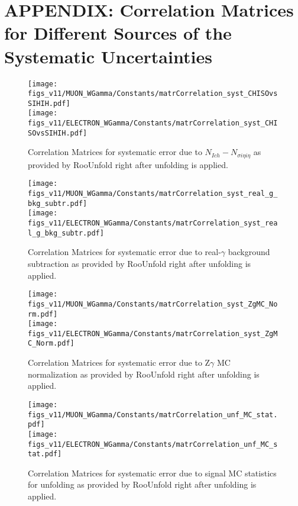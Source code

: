 \section{APPENDIX: Correlation Matrices for Different Sources of the Systematic Uncertainties}
\label{sec:corrMatrices}

\begin{figure}[htb]
  \begin{center}
   \texttt{[image: figs\_v11/MUON\_WGamma/Constants/matrCorrelation\_syst\_CHISOvsSIHIH.pdf]}\\
\texttt{[image: figs\_v11/ELECTRON\_WGamma/Constants/matrCorrelation\_syst\_CHISOvsSIHIH.pdf]}
  \caption{Correlation Matrices for systematic error due to $N_{Ich}-N_{\sigma i\eta i\eta}$ as provided by RooUnfold right after unfolding is applied.}
  \label{fig:corrMatrices_syst_CHISOvsSIHIH_Wg}
  \end{center}
\end{figure}

\begin{figure}[htb]
  \begin{center}
   \texttt{[image: figs\_v11/MUON\_WGamma/Constants/matrCorrelation\_syst\_real\_g\_bkg\_subtr.pdf]}\\
\texttt{[image: figs\_v11/ELECTRON\_WGamma/Constants/matrCorrelation\_syst\_real\_g\_bkg\_subtr.pdf]}
  \caption{Correlation Matrices for systematic error due to real-$\gamma$ background subtraction as provided by RooUnfold right after unfolding is applied.}
  \label{fig:corrMatrices_syst_real_g_bkg_subtr_Wg}
  \end{center}
\end{figure}

\begin{figure}[htb]
  \begin{center}
   \texttt{[image: figs\_v11/MUON\_WGamma/Constants/matrCorrelation\_syst\_ZgMC\_Norm.pdf]}\\
\texttt{[image: figs\_v11/ELECTRON\_WGamma/Constants/matrCorrelation\_syst\_ZgMC\_Norm.pdf]}
  \caption{Correlation Matrices for systematic error due to Z$\gamma$ MC normalization as provided by RooUnfold right after unfolding is applied.}
  \label{fig:corrMatrices_syst_ZgMC_Norm_Wg}
  \end{center}
\end{figure}

\begin{figure}[htb]
  \begin{center}
   \texttt{[image: figs\_v11/MUON\_WGamma/Constants/matrCorrelation\_unf\_MC\_stat.pdf]}\\
\texttt{[image: figs\_v11/ELECTRON\_WGamma/Constants/matrCorrelation\_unf\_MC\_stat.pdf]}
  \caption{Correlation Matrices for systematic error due to signal MC statistics for unfolding as provided by RooUnfold right after unfolding is applied.}
  \label{fig:corrMatrices_syst_unf_MC_stat_Wg}
  \end{center}
\end{figure}

